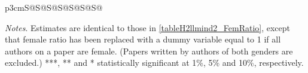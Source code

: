 \begin{table}
\begin{threeparttable}
\begin{tabular}{p{3cm}S@{}S@{}S@{}S@{}S@{}S@{}S@{}}
        \end{tabular}
        \begin{tablenotes}
            \tiny
            \item \textit{Notes}. Estimates are identical to those in \autoref{tableH2llmind2_FemRatio}, except that female ratio has been replaced with a dummy variable equal to 1 if all authors on a paper are female. (Papers written by authors of both genders are excluded.) ***, ** and * statistically significant at 1\%, 5\% and 10\%, respectively.
        \end{tablenotes}
    \end{threeparttable}
\end{table}